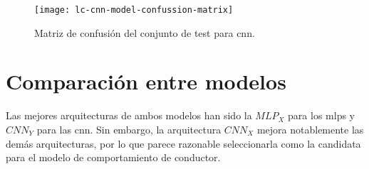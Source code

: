 \begin{figure}
	\centering
	\texttt{[image: lc-cnn-model-confussion-matrix]}
	\caption[Matriz de confusión del conjunto de test para \ac{cnn}]{Matriz de confusión del conjunto de test para \ac{cnn}.}
	\label{fig:lc-cnn-model-confussion-matrix}
\end{figure}

\section{Comparación entre modelos}

Las mejores arquitecturas de ambos modelos han sido la $MLP_X$ para los \acp{mlp} y $CNN_Y$ para las \ac{cnn}. Sin embargo, la arquitectura $CNN_X$ mejora notablemente las demás arquitecturas, por lo que parece razonable seleccionarla como la candidata para el modelo de comportamiento de conductor.